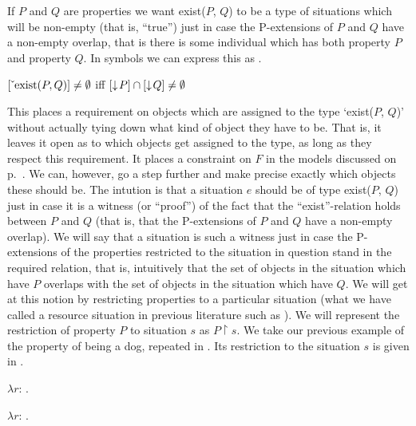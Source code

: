 If $P$ and $Q$ are properties we want exist($P$, $Q$)
to be a type of situations which will be non-empty (that is, ``true'')
just in case the P-extensions of $P$ and $Q$ have a non-empty overlap,
that is there is some individual which has both property $P$ and
property $Q$.  In symbols we can express this as \nexteg{}.
\begin{ex} 
$[\ \!\check{}\ \!\mathrm{exist}(P,Q)]\not=\emptyset$ iff
$[\downarrow\!P]\cap[\downarrow\!Q]\not=\emptyset$ 
\label{ex:constraintexist}
\end{ex} 
This places a requirement on objects which are assigned to the type `exist($P$, $Q$)'
without actually tying down what kind of object they have to be.  That
is, it leaves it open as to which objects get assigned to the type, as
long as they respect this requirement.  It places a constraint on $F$
in the models discussed on p.~\pageref{pg:models}.  We can, however,
go a step further and make precise exactly which objects these should
be.  The intution is that a situation $e$ should be of type exist($P$,
$Q$) just in case it is a witness (or ``proof'') of the fact that the
``exist''-relation holds between $P$ and $Q$ (that is, that the
P-extensions of $P$ and $Q$ have a non-empty overlap). We will say
that a situation is such a witness just in case the P-extensions of
the properties restricted to the situation in question stand in the
required relation, that is, intuitively that the set of objects in the
situation which have $P$ overlaps with the set of objects in the
situation which have $Q$.  We will get at this notion by restricting
properties to a particular situation (what we have called a
resource situation in previous literature such as
\citealp{BarwisePerry1983,Cooper1996a}). We will represent the
restriction of property $P$ to situation $s$ as $P\!\restriction\!
s$. We take our previous example of the property of being a dog,
repeated in .  Its restriction to the situation $s$ is given
in .
\begin{ex} 
\begin{subex} 
 
\item $\lambda r$: .  
 
\item $\lambda r$: .  
 
\end{subex} 
\label{ex:restricteddog}   
\end{ex} 
